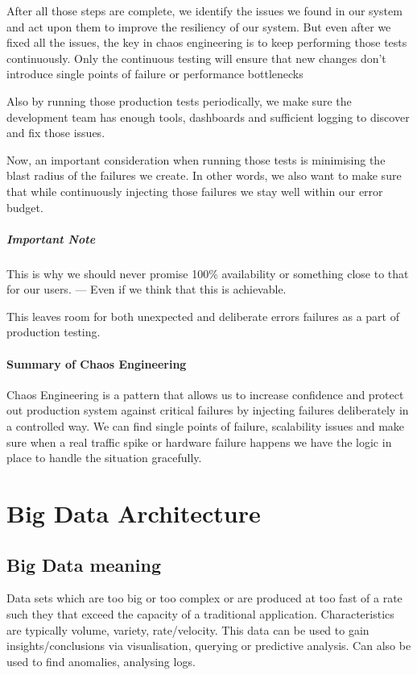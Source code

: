 \documentclass[a4paper, 11pt]{book}
\begin{document}
    After all those steps are complete, we identify the issues we found in our system and act upon them to improve the resiliency of our system.
    But even after we fixed all the issues, the key in chaos engineering is to keep performing those tests continuously.
    Only the continuous testing will ensure that new changes don't introduce single points of failure or performance bottlenecks

    Also by running those production tests periodically, we make sure the development team has enough tools, dashboards and sufficient logging to discover and fix those issues.

    Now, an important consideration when running those tests is minimising the blast radius of the failures we create.
    In other words, we also want to make sure that while continuously injecting those failures we stay well within our error budget.

    \paragraph{Important Note}
    This is why we should never promise 100\% availability or something close to that for our users.
    --- Even if we think that this is achievable.

    This leaves room for both unexpected and deliberate errors failures as a part of production testing.

    \subsubsection{Summary of Chaos Engineering}
    Chaos Engineering is a pattern that allows us to increase confidence and protect out production system against critical failures by injecting failures deliberately in a controlled way.
    We can find single points of failure, scalability issues and make sure when a real traffic spike or hardware failure happens we have the logic in place to handle the situation gracefully.


    \chapter{Big Data Architecture}


    \section{Big Data meaning}
    Data sets which are too big or too complex or are produced at too fast of a rate such they that exceed the capacity of a traditional application.
    Characteristics are typically volume, variety, rate/velocity.
    This data can be used to gain insights/conclusions via visualisation, querying or predictive analysis.
    Can also be used to find anomalies, analysing logs.
\end{document}
